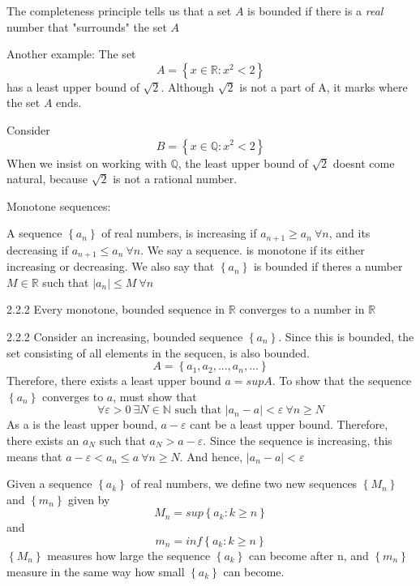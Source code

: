 \documentclass[a4paper,norsk]{article}
\renewcommand{\geq}{\geqslant}
\renewcommand{\leq}{\leqslant}
\renewcommand{\epsilon}{\varepsilon}
\begin{document}
The completeness principle tells us that a set $ A $ is bounded if there is a \textit{real} number that "surrounds" the set $ A $

Another example:
The set 
\[
    A = \left\{ x \in \mathbb{R} : x^2 < 2 \right\} 
\]
has a least upper bound of $ \sqrt{ 2 } $. Although $ \sqrt{ 2 } $ is not a part of A, it marks where the set $ A $ ends. 

Consider
\[
    B = \left\{ x \in  \mathbb{Q} : x^2 < 2 \right\} 
\]
When we insist on working with $ \mathbb{Q} $, the least upper bound of $ \sqrt{ 2 } $ doesnt come natural, because $ \sqrt{ 2 } $ is not a rational number.




Monotone sequences:

A sequence $ \left\{ a_n \right\}  $ of real numbers, is increasing if $ a_{n+1} \geq a_n \: \forall n $, and its decreasing if $ a_{n+1} \leq a_n \: \forall n $. We say a sequence. is monotone if its either increasing or decreasing. We also say that $ \left\{ a_n \right\}  $ is bounded if theres a number $ M \in \mathbb{R} $ such that $ \left| a_n \right| \leq M \: \forall n  $

\begin{theorembox}{2.2.2}{}
Every monotone, bounded sequence in $ \mathbb{R} $ converges to a number in $ \mathbb{R} $ 

\begin{proofbox}{2.2.2}{}
  Consider an increasing, bounded sequence $ \left\{ a_n \right\}  $. Since this is bounded, the set consisting of all elements in the sequcen, is also bounded.
  \[
      A = \left\{ a_1, a_2, ..., a_n, ... \right\} 
  \]
  Therefore, there exists a least upper bound $ a = sup A $. To show that the sequence $ \left\{ a_n \right\}  $ converges to $ a $, must show that 
  \[
      \forall \epsilon > 0 \: \exists N \in \mathbb{N} \text{ such that } \left| a_n - a \right| < \epsilon  \: \forall  n\geq N
  \]
  As a is the least upper bound, $ a - \epsilon  $ cant be a least upper bound. Therefore, there exists an $ a_N $ such that $ a_N > a - \epsilon  $. Since the sequence is increasing, this means that $ a - \epsilon < a_n \leq a \: \forall n \geq N $. And hence, $ \left| a_n - a \right| < \epsilon  $ 
  
\end{proofbox}
\end{theorembox}

Given a sequence $ \left\{ a_k \right\}  $ of real numbers, we define two new sequences $ \left\{ M_n \right\}  $ and $ \left\{ m_n \right\}  $ given by
\[
    M_n = sup \left\{ a_k : k \geq n \right\} 
\]
and
\[
    m_n = inf \left\{ a_k : k \geq n \right\} 
\]
$ \left\{ M_n \right\}  $ measures how large the sequence $ \left\{ a_k \right\}  $ can become after n, and $ \left\{ m_n \right\}  $ measure in the same way how small $ \left\{ a_k \right\}  $ can become. 
\end{document}
